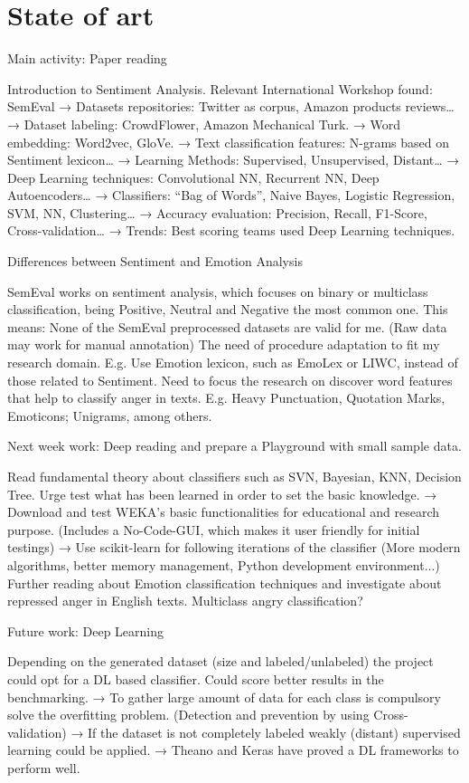 \chapter{State of art}

Main activity: Paper reading

Introduction to Sentiment Analysis.
Relevant International Workshop found: SemEval
→ Datasets repositories: Twitter as corpus, Amazon products reviews…
→ Dataset labeling: CrowdFlower, Amazon Mechanical Turk.
→ Word embedding: Word2vec, GloVe.
→ Text classification features: N-grams based on Sentiment lexicon…
→ Learning Methods: Supervised, Unsupervised, Distant…
→ Deep Learning techniques: Convolutional NN, Recurrent NN, Deep Autoencoders…
→ Classifiers: “Bag of Words”, Naive Bayes, Logistic Regression, SVM, NN, Clustering…
→ Accuracy evaluation: Precision, Recall, F1-Score, Cross-validation…
→ Trends: Best scoring teams used Deep Learning techniques.

Differences between Sentiment and Emotion Analysis

SemEval works on sentiment analysis, which focuses on binary or multiclass classification, being Positive, Neutral and Negative the most common one.
This means:
 None of the SemEval preprocessed datasets are valid for me. (Raw data may work for manual annotation)
 The need of procedure adaptation to fit my research domain.
E.g. Use Emotion lexicon, such as EmoLex or LIWC, instead of  those related to Sentiment.
Need to focus the research on discover word features that help to classify anger in texts.
E.g. Heavy Punctuation, Quotation Marks, Emoticons; Unigrams, among others.

Next week work: Deep reading and prepare a Playground with small sample data.

Read fundamental theory about classifiers such as SVN, Bayesian, KNN, Decision Tree.
Urge test what has been learned in order to set the basic knowledge.
→ Download and test WEKA’s basic functionalities for educational and research purpose. (Includes a No-Code-GUI, which makes it user friendly for initial testings)
→ Use scikit-learn for following iterations of the classifier (More modern algorithms, better memory management, Python development environment...)
Further reading about Emotion classification techniques and investigate about repressed anger in English texts. 
Multiclass angry classification?

Future work: Deep Learning

Depending on the generated dataset (size and labeled/unlabeled) the project could opt for a DL based classifier.
Could score better results in the benchmarking.
→ To gather large amount of data for each class is compulsory solve the overfitting problem. (Detection and prevention by using Cross-validation)
→ If the dataset is not completely labeled weakly (distant) supervised learning could be applied.
→ Theano and Keras have proved a DL frameworks to perform well.


